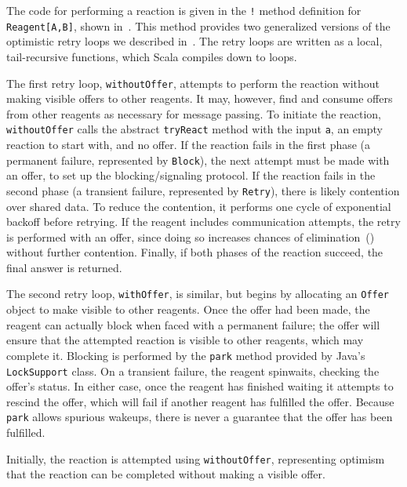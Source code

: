 \documentclass[preprint,nocopyrightspace]{sigplanconf}
\begin{document}
The code for performing a reaction is given in the \lstinline{!} method
definition for \lstinline{Reagent[A,B]}, shown in~.  This
method provides two generalized versions of the optimistic retry loops we
described in~.  The retry loops are written as a local,
tail-recursive functions, which Scala compiles down to loops.

The first retry loop, \lstinline{withoutOffer}, attempts to perform the
reaction without making visible offers to other reagents.  It may, however,
find and consume offers from other reagents as necessary for message passing.
To initiate the reaction, \lstinline{withoutOffer} calls the abstract
\lstinline{tryReact} method with the input \lstinline{a}, an empty reaction to
start with, and no offer.  If the reaction fails in the first phase (a
permanent failure, represented by \lstinline{Block}), the next attempt must be
made with an offer, to set up the blocking/signaling protocol.  If the
reaction fails in the second phase (a transient failure, represented by
\lstinline{Retry}), there is likely contention over shared data.  To reduce
the contention, it performs one cycle of exponential backoff before retrying.
If the reagent includes communication attempts, the retry is performed with an
offer, since doing so increases chances of elimination~()
without further contention.  Finally, if both phases of the reaction succeed,
the final answer is returned.

The second retry loop, \lstinline{withOffer}, is similar, but begins by
allocating an \lstinline{Offer} object to make visible to other reagents.  Once
the offer had been made, the reagent can actually block when faced with a
permanent failure; the offer will ensure that the attempted reaction is visible
to other reagents, which may complete it.  Blocking is performed by the
\lstinline{park} method provided by Java's \lstinline{LockSupport} class.  On a
transient failure, the reagent spinwaits, checking the offer's status.  In
either case, once the reagent has finished waiting it attempts to rescind the
offer, which will fail if another reagent has fulfilled the offer.  Because
\lstinline{park} allows spurious wakeups, there is never a guarantee that the
offer has been fulfilled.

Initially, the reaction is attempted using \lstinline{withoutOffer},
representing optimism that the reaction can be completed without making a
visible offer.
\end{document}
